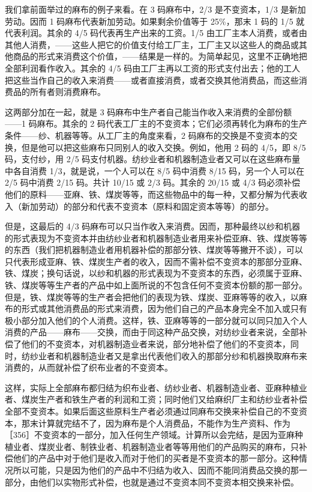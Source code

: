 我们拿前面举过的麻布的例子来看。在 3 码麻布中，2/3 是不变资本，1/3 是新加劳动。因而 1 码麻布代表新加劳动。如果剩余价值等于 25\%，那末 1 码的 1/5 就代表利润。其余的 4/5 码代表再生产出来的工资。1/5 由工厂主本人消费，或者由其他人消费，——这些人把它的价值支付给工厂主，工厂主又以这些人的商品或其他商品的形式来消费这个价值，——结果是一样的。\fontbox{~\{}为简单起见，这里不正确地把全部利润看作收入。\fontbox{\}~}其余的 4/5 码由工厂主再以工资的形式支付出去；他的工人把这些当作自己的收入来消费——或者直接消费，或者交换其他消费品，而这些消费品的所有者则消费麻布。

这两部分加在一起，就是 3 码麻布中生产者自己能当作收入来消费的全部份额——1 码麻布。其余的 2 码代表工厂主的不变资本；它们必须再转化为麻布的生产条件——纱、机器等等。从工厂主的角度来看，2 码麻布的交换是不变资本的交换，但是他可以把这些麻布只同别人的收入交换。例如，他用 2 码的 4/5，即 8/5 码，支付纱，用 2/5 码支付机器。纺纱业者和机器制造业者又可以在这些麻布量中各自消费 1/3，就是说，一个人可以在 8/5 码中消费 8/15 码，另一个人可以在 2/5 码中消费 2/15 码。共计 10/15 或 2/3 码。其余的 20/15 或 4/3 码必须补偿他们的原料——亚麻、铁、煤炭等等，而这些物品中的每一种，又都分解为代表收入（新加劳动）的部分和代表不变资本（原料和固定资本等等）的部分。

但是，这最后的 4/3 码麻布可以只当作收入来消费。因而，那种最终以纱和机器的形式表现为不变资本并由纺纱业者和机器制造业者用来补偿亚麻、铁、煤炭等等的东西（我们把机器制造业者用机器补偿的那部分铁、煤炭等等撇开不谈），可以只代表形成亚麻、铁、煤炭生产者的收入，因而不需补偿不变资本的那部分亚麻、铁、煤炭；换句话说，以纱和机器的形式表现为不变资本的东西，必须属于亚麻、铁、煤炭等等生产者的产品中如上面所说的不包含任何不变资本份额的那一部分。但是，铁、煤炭等等的生产者会把他们的表现为铁、煤炭、亚麻等等的收入，以麻布的形式或其他消费品的形式来消费，因为他们自己的产品本身完全不加入或只有极小部分加入他们的个人消费。这样，铁、亚麻等等的一部分就可以同只加入个人消费的产品——麻布——交换，而由于同这种产品交换，对纺纱业者来说，全部补偿了他们的不变资本，对机器制造业者来说，部分地补偿了他们的不变资本，同时，纺纱业者和机器制造业者又是拿出代表他们收入的那部分纱和机器换取麻布来消费的，从而就补偿了织布业者的不变资本。

这样，实际上全部麻布都归结为织布业者、纺纱业者、机器制造业者、亚麻种植业者、煤炭生产者和铁生产者的利润和工资；同时他们又给麻织厂主和纺纱业者补偿全部不变资本。如果后面这些原料生产者必须通过同麻布交换来补偿自己的不变资本，那末计算就完结不了，因为麻布是个人消费品，不能作为生产资料、作为［356］不变资本的一部分，加入任何生产领域。计算所以会完结，是因为亚麻种植业者、煤炭业者、制铁业者、机器制造业者等等用他们的产品购买的麻布，只补偿他们的产品中对于他们是收入而对于他们的买者是不变资本的那一部分。这种情况所以可能，只是因为他们的产品中不归结为收入、因而不能同消费品交换的那一部分，由他们以实物形式补偿，也就是通过不变资本同不变资本相交换来补偿。

